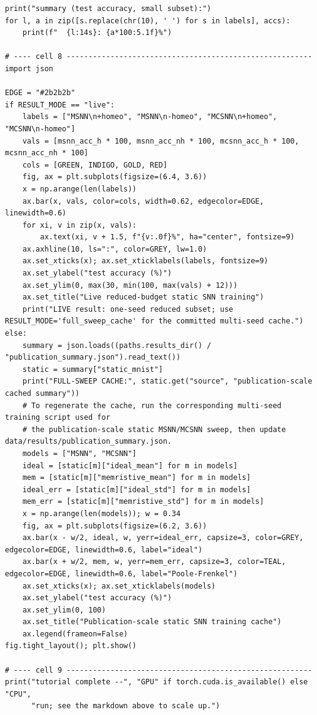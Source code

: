 \begin{lstlisting}[caption={experiments/examples.ipynb},label={lst:mnn-nb-examples}]
print("summary (test accuracy, small subset):")
for l, a in zip([s.replace(chr(10), ' ') for s in labels], accs):
    print(f"  {l:14s}: {a*100:5.1f}%")

# ---- cell 8 --------------------------------------------------------
import json

EDGE = "#2b2b2b"
if RESULT_MODE == "live":
    labels = ["MSNN\n+homeo", "MSNN\n-homeo", "MCSNN\n+homeo", "MCSNN\n-homeo"]
    vals = [msnn_acc_h * 100, msnn_acc_nh * 100, mcsnn_acc_h * 100, mcsnn_acc_nh * 100]
    cols = [GREEN, INDIGO, GOLD, RED]
    fig, ax = plt.subplots(figsize=(6.4, 3.6))
    x = np.arange(len(labels))
    ax.bar(x, vals, color=cols, width=0.62, edgecolor=EDGE, linewidth=0.6)
    for xi, v in zip(x, vals):
        ax.text(xi, v + 1.5, f"{v:.0f}%", ha="center", fontsize=9)
    ax.axhline(10, ls=":", color=GREY, lw=1.0)
    ax.set_xticks(x); ax.set_xticklabels(labels, fontsize=9)
    ax.set_ylabel("test accuracy (%)")
    ax.set_ylim(0, max(30, min(100, max(vals) + 12)))
    ax.set_title("Live reduced-budget static SNN training")
    print("LIVE result: one-seed reduced subset; use RESULT_MODE='full_sweep_cache' for the committed multi-seed cache.")
else:
    summary = json.loads((paths.results_dir() / "publication_summary.json").read_text())
    static = summary["static_mnist"]
    print("FULL-SWEEP CACHE:", static.get("source", "publication-scale cached summary"))
    # To regenerate the cache, run the corresponding multi-seed training script used for
    # the publication-scale static MSNN/MCSNN sweep, then update data/results/publication_summary.json.
    models = ["MSNN", "MCSNN"]
    ideal = [static[m]["ideal_mean"] for m in models]
    mem = [static[m]["memristive_mean"] for m in models]
    ideal_err = [static[m]["ideal_std"] for m in models]
    mem_err = [static[m]["memristive_std"] for m in models]
    x = np.arange(len(models)); w = 0.34
    fig, ax = plt.subplots(figsize=(6.2, 3.6))
    ax.bar(x - w/2, ideal, w, yerr=ideal_err, capsize=3, color=GREY, edgecolor=EDGE, linewidth=0.6, label="ideal")
    ax.bar(x + w/2, mem, w, yerr=mem_err, capsize=3, color=TEAL, edgecolor=EDGE, linewidth=0.6, label="Poole-Frenkel")
    ax.set_xticks(x); ax.set_xticklabels(models)
    ax.set_ylabel("test accuracy (%)")
    ax.set_ylim(0, 100)
    ax.set_title("Publication-scale static SNN training cache")
    ax.legend(frameon=False)
fig.tight_layout(); plt.show()

# ---- cell 9 --------------------------------------------------------
print("tutorial complete --", "GPU" if torch.cuda.is_available() else "CPU",
      "run; see the markdown above to scale up.")
\end{lstlisting}

